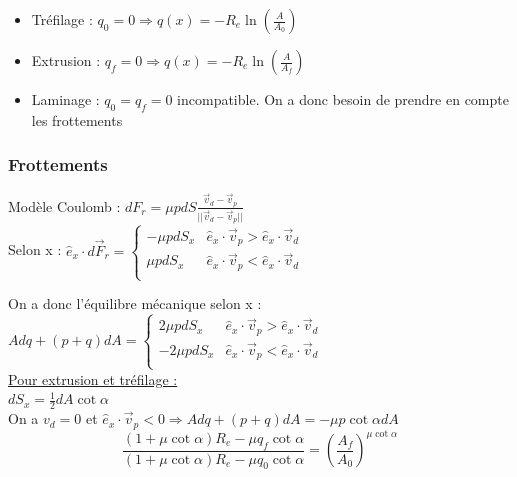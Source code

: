 \documentclass[../main.tex]{subfiles}
\begin{document}
\begin{itemize}
    \item Tréfilage : $q_0 = 0 \Rightarrow q(x) = -R_e \ln(\frac{A}{A_0})$\\
    \item Extrusion : $q_f = 0 \Rightarrow q(x) = -R_e \ln(\frac{A}{A_f})$\\
    \item Laminage : $q_0 = q_f = 0$ incompatible. On a donc besoin de prendre en compte les frottements\\
\end{itemize}

\subsubsection{Frottements}
Modèle Coulomb : $dF_r = \mu pdS \frac{\Vec{v}_d-\Vec{v}_p}{\lvert \lvert \Vec{v}_d-\Vec{v}_p \rvert \rvert}$\\

Selon x : $\hat{e}_x \cdot d\Vec{F}_r = \begin{cases}
    -\mu pdS_x & \hat{e}_x \cdot \Vec{v}_p > \hat{e}_x\cdot \Vec{v}_d\\
    \mu pdS_x & \hat{e}_x \cdot \Vec{v}_p < \hat{e}_x\cdot \Vec{v}_d\\
\end{cases}$

On a donc l'équilibre mécanique selon x :\\
$Adq+(p+q)dA = \begin{cases}
    2\mu pdS_x & \hat{e}_x \cdot \Vec{v}_p > \hat{e}_x\cdot \Vec{v}_d\\
    -2\mu pdS_x & \hat{e}_x \cdot \Vec{v}_p < \hat{e}_x\cdot \Vec{v}_d\\
\end{cases}$\\

\quad \underline{Pour extrusion et tréfilage :}\\
$dS_x = \frac{1}{2}dA \cot{\alpha}$\\
On a $v_d = 0$ et $\hat{e}_x \cdot \Vec{v}_p < 0 \Rightarrow Adq + (p+q)dA = -\mu p \cot{\alpha} dA$\\

\begin{equation}
    \frac{(1+\mu \cot{\alpha})R_e - \mu q_f \cot{\alpha}}{(1+\mu \cot{\alpha})R_e - \mu q_0 \cot{\alpha}} = (\frac{A_f}{A_0})^{\mu \cot{\alpha}}
\end{equation}
\end{document}
